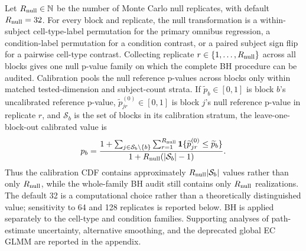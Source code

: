 \documentclass[11pt]{article}
\begin{document}
Let \(R_{\rm null}\in\mathbb N\) be the number of Monte Carlo null replicates, with default \(R_{\rm null}=32\). For every block and replicate, the null transformation is a within-subject cell-type-label permutation for the primary omnibus regression, a condition-label permutation for a condition contrast, or a paired subject sign flip for a pairwise cell-type contrast. Collecting replicate \(r\in\{1,\ldots,R_{\rm null}\}\) across all blocks gives one null p-value family on which the complete BH procedure can be audited. Calibration pools the null reference p-values across blocks only within matched tested-dimension and subject-count strata. If \(\widetilde p_b\in[0,1]\) is block \(b\)'s uncalibrated reference p-value, \(\widetilde p_{jr}^{(0)}\in[0,1]\) is block \(j\)'s null reference p-value in replicate \(r\), and \(\mathcal S_b\) is the set of blocks in its calibration stratum, the leave-one-block-out calibrated value is \[p_b=\frac{1+\sum_{j\in\mathcal S_b\setminus\{b\}}\sum_{r=1}^{R_{\rm null}}\mathbf1\{\widetilde p_{jr}^{(0)}\leq\widetilde p_b\}}{1+R_{\rm null}(|\mathcal S_b|-1)}.\] Thus the calibration CDF contains approximately \(R_{\rm null}|\mathcal S_b|\) values rather than only \(R_{\rm null}\), while the whole-family BH audit still contains only \(R_{\rm null}\) realizations. The default 32 is a computational choice rather than a theoretically distinguished value; sensitivity to 64 and 128 replicates is reported below. BH is applied separately to the cell-type and condition families. Supporting analyses of path-estimate uncertainty, alternative smoothing, and the deprecated global EC GLMM are reported in the appendix.
\end{document}
